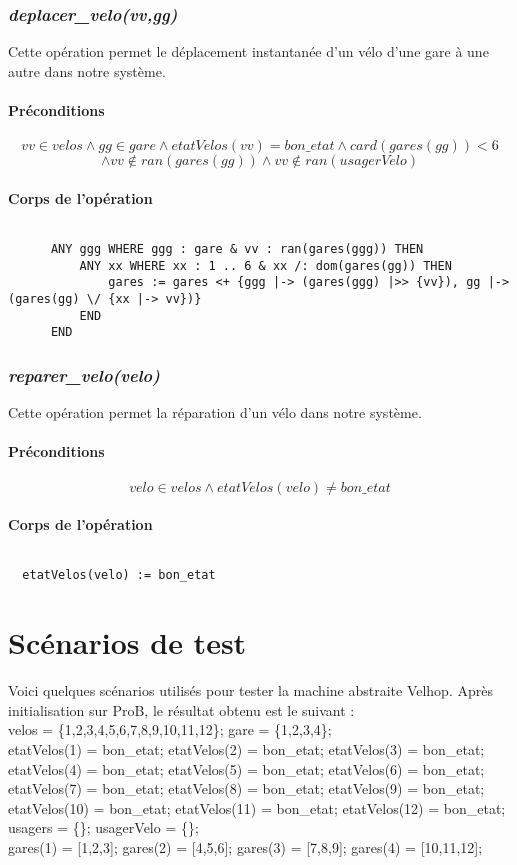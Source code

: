 \documentclass[12pt]{article}
\begin{document}
\subsubsection{\textit{deplacer\_velo(vv,gg)}}
Cette opération permet le déplacement instantanée d'un vélo d'une gare à une autre dans notre système.
\paragraph{Préconditions}
\[ vv \in velos \land gg \in gare \land etatVelos(vv) = bon\_etat \land card(gares(gg))<6 \]
\[\land vv \notin ran(gares(gg)) \land vv \notin ran(usagerVelo)\]
\paragraph{Corps de l'opération}
\[\]
\begin{lstlisting}
      ANY ggg WHERE ggg : gare & vv : ran(gares(ggg)) THEN
          ANY xx WHERE xx : 1 .. 6 & xx /: dom(gares(gg)) THEN
              gares := gares <+ {ggg |-> (gares(ggg) |>> {vv}), gg |-> (gares(gg) \/ {xx |-> vv})}
          END
      END
\end{lstlisting}

\subsubsection{\textit{reparer\_velo(velo)}}
Cette opération permet la réparation d'un vélo dans notre système.
\paragraph{Préconditions}
\[ velo \in velos \land etatVelos(velo) \neq bon\_etat \]
\paragraph{Corps de l'opération}
\[\]
\begin{lstlisting}
  etatVelos(velo) := bon_etat
\end{lstlisting}
\newpage
\section{Scénarios de test}
Voici quelques scénarios utilisés pour tester la machine abstraite Velhop. Après initialisation sur ProB, le résultat obtenu est le suivant : \\
velos = \{1,2,3,4,5,6,7,8,9,10,11,12\};
gare = \{1,2,3,4\}; \\
etatVelos(1) = bon\_etat;
etatVelos(2) = bon\_etat;
etatVelos(3) = bon\_etat;
etatVelos(4) = bon\_etat;
etatVelos(5) = bon\_etat;
etatVelos(6) = bon\_etat;
etatVelos(7) = bon\_etat;
etatVelos(8) = bon\_etat;
etatVelos(9) = bon\_etat;
etatVelos(10) = bon\_etat;
etatVelos(11) = bon\_etat;
etatVelos(12) = bon\_etat;  \\
usagers = \{\};
usagerVelo = \{\}; \\
gares(1) = [1,2,3];
gares(2) = [4,5,6];
gares(3) = [7,8,9];
gares(4) = [10,11,12];
\end{document}
